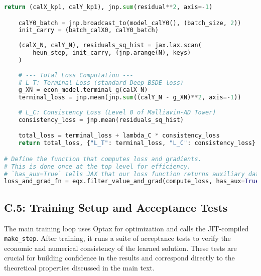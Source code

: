 \documentclass[11pt,letterpaper,oneside]{article}
\theoremstyle{plain}
\theoremstyle{definition}
\theoremstyle{remark}
\begin{document}
\begin{lstlisting}[language=Python, caption={C.4: JAX Implementation of the Consistency-Regularized Loss with Heun Scheme.}, label={lst:jax_loss_fn_app_appendix}]
        return (calX_kp1, calY_kp1), jnp.sum(residual**2, axis=-1)

    calY0_batch = jnp.broadcast_to(model_calY0(), (batch_size, 2))
    init_carry = (batch_calX0, calY0_batch)
    
    (calX_N, calY_N), residuals_sq_hist = jax.lax.scan(
        heun_step, init_carry, (jnp.arange(N), keys)
    )
    
    # --- Total Loss Computation ---
    # L_T: Terminal Loss (standard Deep BSDE loss)
    g_XN = econ_model.terminal_g(calX_N)
    terminal_loss = jnp.mean(jnp.sum((calY_N - g_XN)**2, axis=-1))
    
    # L_C: Consistency Loss (Level 0 of Malliavin-AD Tower)
    consistency_loss = jnp.mean(residuals_sq_hist)

    total_loss = terminal_loss + lambda_C * consistency_loss
    return total_loss, {"L_T": terminal_loss, "L_C": consistency_loss}

# Define the function that computes loss and gradients.
# This is done once at the top level for efficiency.
# `has_aux=True` tells JAX that our loss function returns auxiliary data (the dict).
loss_and_grad_fn = eqx.filter_value_and_grad(compute_loss, has_aux=True)
\end{lstlisting}

\subsection{C.5: Training Setup and Acceptance Tests}
The main training loop uses Optax for optimization and calls the JIT-compiled \texttt{make\_step}. After training, it runs a suite of acceptance tests to verify the economic and numerical consistency of the learned solution. These tests are crucial for building confidence in the results and correspond directly to the theoretical properties discussed in the main text.
\end{document}
